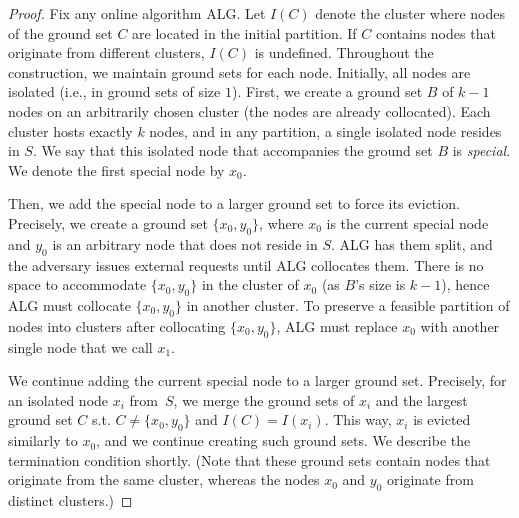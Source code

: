 \documentclass[a4paper,anonymous,USenglish]{lipics-v2019}
\newcommand{\ALG}{\textsc{ALG}\xspace}
\begin{document}
\begin{proof}
	Fix any online algorithm \ALG{}.
	Let $I(C)$ denote the cluster where nodes of the ground set $C$ are located in the initial partition.
	If $C$ contains nodes that originate from different clusters, $I(C)$ is undefined.
	Throughout the construction, we maintain ground sets for each node.
	Initially, all nodes are isolated (i.e., in ground sets of size $1$).
	First, we create a ground set $B$ of $k-1$ nodes on an arbitrarily chosen cluster (the nodes  are already collocated).
	Each cluster hosts exactly $k$ nodes, and in any partition, a single isolated node resides in $S$.
	We say that this isolated node that accompanies the ground set $B$ is \emph{special}.
	We denote the first special node by $x_0$.

	Then, we add the special node to a larger ground set to force its eviction.
	Precisely,
	we create a ground set $\{x_0, y_0\}$, 
	where $x_0$ is the current special node and $y_0$ is an arbitrary node that does not reside in $S$.
	\ALG has them split, and the adversary issues external requests until \ALG collocates them.
	There is no space to accommodate $\{x_0, y_0\}$ in the cluster of $x_0$ (as $B$'s size is $k-1$), hence \ALG must collocate $\{x_0, y_0\}$ in another cluster.
	To preserve a feasible partition of nodes into clusters after collocating $\{x_0, y_0\}$,
	\ALG must replace $x_0$ with another single node that we call $x_1$.

	We continue adding the current special node to a larger ground set.
	Precisely, for an isolated node $x_i$ from~$S$, we merge the ground sets of $x_i$ and the largest ground set $C$ s.t. $C \neq \{x_0,y_0\}$ and $I(C) = I(x_i)$.
	This way, $x_i$ is evicted similarly to $x_0$, and we continue creating such ground sets.
	We describe the termination condition shortly.
	(Note that these ground sets contain nodes that originate from the same cluster, whereas the nodes $x_0$ and $y_0$ originate from distinct clusters.)


\end{proof}
\end{document}
